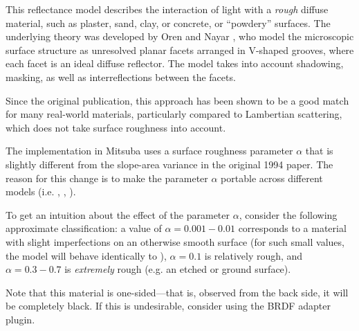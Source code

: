 
This reflectance model describes the interaction of light with a \emph{rough}
diffuse material, such as plaster, sand, clay, or concrete, or ``powdery''
surfaces. The underlying theory was developed by Oren and Nayar
\cite{Oren1994Generalization}, who model the microscopic surface structure as
unresolved planar facets arranged in V-shaped grooves, where each facet
is an ideal diffuse reflector. The model takes into account shadowing,
masking, as well as interreflections between the facets.

Since the original publication, this approach has been shown to
be a good match for many real-world materials, particularly compared
to Lambertian scattering, which does not take surface roughness into account.

The implementation in Mitsuba uses a surface roughness parameter $\alpha$ that
is slightly different from the slope-area variance in the original 1994 paper.
The reason for this change is to make the parameter $\alpha$ portable
across different models (i.e. , ,
).

To get an intuition about the effect of the
parameter $\alpha$, consider the following approximate classification:
a value of $\alpha=0.001-0.01$ corresponds to a material
with slight imperfections on an otherwise smooth surface (for such small
values, the model will behave identically to ), $\alpha=0.1$
is relatively rough, and $\alpha=0.3-0.7$ is \emph{extremely} rough
(e.g. an etched or ground surface).

Note that this material is one-sided---that is, observed from the
back side, it will be completely black. If this is undesirable,
consider using the  BRDF adapter plugin.

